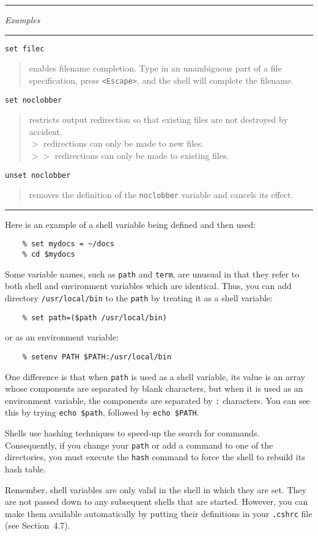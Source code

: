 \documentclass[twoside,11pt]{article}
\newcommand{\htmlref}[2]{#1}
\newcommand{\example}[2]{\goodbreak
                         {\tt #1}
                         \vspace*{-4mm}
                         \begin{quote}
                           {\small #2}
                         \end{quote}
                        }
\newcommand{\example}[2]{\goodbreak
                            {\tt #1}
                            \vspace*{-4mm}
                            \begin{quote}
                            {#2}
                            \end{quote}
                           }
\newcommand{\exbegin}{\begin{center}
                      \rule{18mm}{0.3mm}
                      {\em Examples}
                      \rule{18mm}{0.3mm}
                      \end{center}
                     }
\newcommand{\exend}{\begin{center}
                    \rule{50mm}{0.3mm}
                    \end{center}
                   }
\begin{document}
\goodbreak

\exbegin

\example{set filec}
{enables filename completion.
Type in an unambiguous part of a file specification, press {\tt <Escape>}, and
the shell will complete the filename.}

\example{set noclobber}
{restricts output redirection so that existing files are not destroyed by
accident.\\
{\tt $>$} redirections can only be made to new files.\\
{\tt  $>>$} redirections can only be made to existing files.}

\example{unset noclobber}
{removes the definition of the {\tt noclobber} variable and cancels its effect.}

\exend

Here is an example of a shell variable being defined and then used:
\begin{verbatim}
    % set mydocs = ~/docs
    % cd $mydocs
\end{verbatim}

Some variable names, such as {\tt path} and {\tt term}, are unusual in that
they refer to both shell and environment variables which are identical.
Thus, you can add directory {\tt /usr/local/bin} to the {\tt path} by treating
it as a shell variable:
\begin{verbatim}
    % set path=($path /usr/local/bin)
\end{verbatim}
or as an environment variable:
\begin{verbatim}
    % setenv PATH $PATH:/usr/local/bin
\end{verbatim}
One difference is that when {\tt path} is used as a shell variable, its value is
an array whose components are separated by blank characters, but when it is
used as an environment variable, the components are separated by {\tt :}
characters.
You can see this by trying {\tt echo \$path}, followed by {\tt echo \$PATH}.

Shells use hashing techniques to speed-up the search for commands.
Consequently, if you change your {\tt path} or add a command to one of
the directories, you must execute the {\tt hash} command to force the shell
to rebuild its hash table.

Remember, shell variables are only valid in the shell in which they are set.
They are not passed down to any subsequent shells that are started.
However, you can make them available automatically by putting their definitions
in your {\tt .cshrc} file (see \htmlref{Section~4.7}{ss1}).
\end{document}
